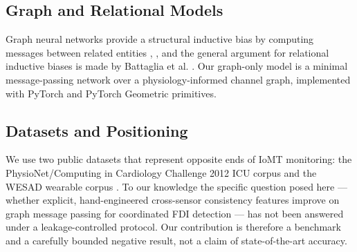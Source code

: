 \documentclass[conference]{IEEEtran}
\begin{document}
\subsection{Graph and Relational Models}
Graph neural networks provide a structural inductive bias by computing messages between related entities \cite{kipf2017}, \cite{gilmer2017}, and the general argument for relational inductive biases is made by Battaglia et al. \cite{battaglia2018}. Our graph-only model is a minimal message-passing network over a physiology-informed channel graph, implemented with PyTorch \cite{paszke2019} and PyTorch Geometric \cite{fey2019} primitives.
\subsection{Datasets and Positioning}
We use two public datasets that represent opposite ends of IoMT monitoring: the PhysioNet/Computing in Cardiology Challenge 2012 ICU corpus \cite{silva2012} and the WESAD wearable corpus \cite{schmidt2018}. To our knowledge the specific question posed here --- whether explicit, hand-engineered cross-sensor consistency features improve on graph message passing for coordinated FDI detection --- has not been answered under a leakage-controlled protocol. Our contribution is therefore a benchmark and a carefully bounded negative result, not a claim of state-of-the-art accuracy.
\end{document}

